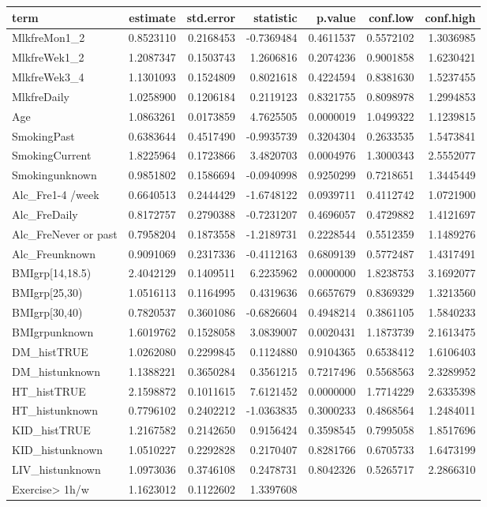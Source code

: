 \documentclass[]{article}
\begin{document}
\begin{longtable}[]{@{}lrrrrrr@{}}
\toprule
term & estimate & std.error & statistic & p.value & conf.low &
conf.high\tabularnewline
\midrule
\endhead
MlkfreMon1\_2 & 0.8523110 & 0.2168453 & -0.7369484 & 0.4611537 &
0.5572102 & 1.3036985\tabularnewline
MlkfreWek1\_2 & 1.2087347 & 0.1503743 & 1.2606816 & 0.2074236 &
0.9001858 & 1.6230421\tabularnewline
MlkfreWek3\_4 & 1.1301093 & 0.1524809 & 0.8021618 & 0.4224594 &
0.8381630 & 1.5237455\tabularnewline
MlkfreDaily & 1.0258900 & 0.1206184 & 0.2119123 & 0.8321755 & 0.8098978
& 1.2994853\tabularnewline
Age & 1.0863261 & 0.0173859 & 4.7625505 & 0.0000019 & 1.0499322 &
1.1239815\tabularnewline
SmokingPast & 0.6383644 & 0.4517490 & -0.9935739 & 0.3204304 & 0.2633535
& 1.5473841\tabularnewline
SmokingCurrent & 1.8225964 & 0.1723866 & 3.4820703 & 0.0004976 &
1.3000343 & 2.5552077\tabularnewline
Smokingunknown & 0.9851802 & 0.1586694 & -0.0940998 & 0.9250299 &
0.7218651 & 1.3445449\tabularnewline
Alc\_Fre1-4 /week & 0.6640513 & 0.2444429 & -1.6748122 & 0.0939711 &
0.4112742 & 1.0721900\tabularnewline
Alc\_FreDaily & 0.8172757 & 0.2790388 & -0.7231207 & 0.4696057 &
0.4729882 & 1.4121697\tabularnewline
Alc\_FreNever or past & 0.7958204 & 0.1873558 & -1.2189731 & 0.2228544 &
0.5512359 & 1.1489276\tabularnewline
Alc\_Freunknown & 0.9091069 & 0.2317336 & -0.4112163 & 0.6809139 &
0.5772487 & 1.4317491\tabularnewline
BMIgrp{[}14,18.5) & 2.4042129 & 0.1409511 & 6.2235962 & 0.0000000 &
1.8238753 & 3.1692077\tabularnewline
BMIgrp{[}25,30) & 1.0516113 & 0.1164995 & 0.4319636 & 0.6657679 &
0.8369329 & 1.3213560\tabularnewline
BMIgrp{[}30,40) & 0.7820537 & 0.3601086 & -0.6826604 & 0.4948214 &
0.3861105 & 1.5840233\tabularnewline
BMIgrpunknown & 1.6019762 & 0.1528058 & 3.0839007 & 0.0020431 &
1.1873739 & 2.1613475\tabularnewline
DM\_histTRUE & 1.0262080 & 0.2299845 & 0.1124880 & 0.9104365 & 0.6538412
& 1.6106403\tabularnewline
DM\_histunknown & 1.1388221 & 0.3650284 & 0.3561215 & 0.7217496 &
0.5568563 & 2.3289952\tabularnewline
HT\_histTRUE & 2.1598872 & 0.1011615 & 7.6121452 & 0.0000000 & 1.7714229
& 2.6335398\tabularnewline
HT\_histunknown & 0.7796102 & 0.2402212 & -1.0363835 & 0.3000233 &
0.4868564 & 1.2484011\tabularnewline
KID\_histTRUE & 1.2167582 & 0.2142650 & 0.9156424 & 0.3598545 &
0.7995058 & 1.8517696\tabularnewline
KID\_histunknown & 1.0510227 & 0.2292828 & 0.2170407 & 0.8281766 &
0.6705733 & 1.6473199\tabularnewline
LIV\_histunknown & 1.0973036 & 0.3746108 & 0.2478731 & 0.8042326 &
0.5265717 & 2.2866310\tabularnewline
Exercise\textgreater{} 1h/w & 1.1623012 & 0.1122602 & 1.3397608 &

\end{longtable}
\end{document}
